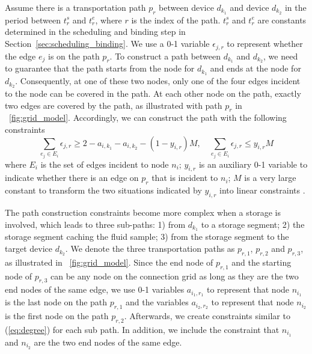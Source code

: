Assume there is a transportation path $p_r$ between
device $d_{k_1}$ and device $d_{k_2}$ in the period between
$t^s_{r}$ and ${t^e_{r}}$, where $r$ is the index of the path.
$t^s_{r}$ and ${t^e_{r}}$ are constants determined in the
scheduling and binding step in Section~\ref{sec:scheduling_binding}.
We use a 0-1 variable $\epsilon_{j,r}$ to represent whether the edge
$e_j$ is on the path $p_r$.
To construct a path between $d_{k_1}$ and $d_{k_2}$, we need to
guarantee that the path starts from the node for $d_{k_1}$
and ends at the node for $d_{k_2}$.
Consequently, at one of these two nodes, only one of the four edges incident
to the node can be covered in the path.
At each other node on the path, exactly two edges are covered by the path, as
illustrated with path $p_r$ in \figname~\ref{fig:grid_model}.
Accordingly, we can
construct the path with the following constraints
\begin{equation}\label{eq:degree}
\sum_{e_j\in E_i}{\epsilon_{j,r}}\ge 2-a_{i, k_1}-a_{i, k_2}-(1-y_{i,r})M, \quad
\sum_{e_j\in E_i}{\epsilon_{j,r}}\le y_{i,r}M
\end{equation}
where $E_i$ is the set of edges incident to node $n_i$; $y_{i,r}$ is an
auxiliary 0-1 variable to indicate
whether there is an edge on $p_r$ that is incident to $n_i$;
$M$ is a very large constant to transform the two
situations indicated by $y_{i,r}$ into linear constraints
\cite{chen2011applied}.

The path construction constraints become more complex when a storage is involved,
which leads to three sub-paths: 1) from $d_{k_1}$ to a storage segment; 2)
the storage segment caching the fluid sample; 3) from the storage segment to the
target device $d_{k_2}$.
We denote the three transportation paths as $p_{r, 1}$,
$p_{r, 2}$ and $p_{r,3}$, as illustrated in \figname~\ref{fig:grid_model}.
Since the end node of $p_{r,1}$ and the starting
node of $p_{r, 3}$ can be any node on the connection grid as long as they are
the two end nodes of the same edge,
we use 0-1 variables $a_{i_1,r_1}$ to represent that node
$n_{i_1}$ is the last node on the path $p_{r,1}$ and the
variables $a_{i_2,r_2}$ to represent that node
$n_{i_2}$ is the first node on the path $p_{r,2}$.
Afterwards, we create constraints similar to (\ref{eq:degree}) for each
sub path. In addition, we include the constraint that $n_{i_1}$ and $n_{i_2}$
are the two end nodes of the same edge. %

